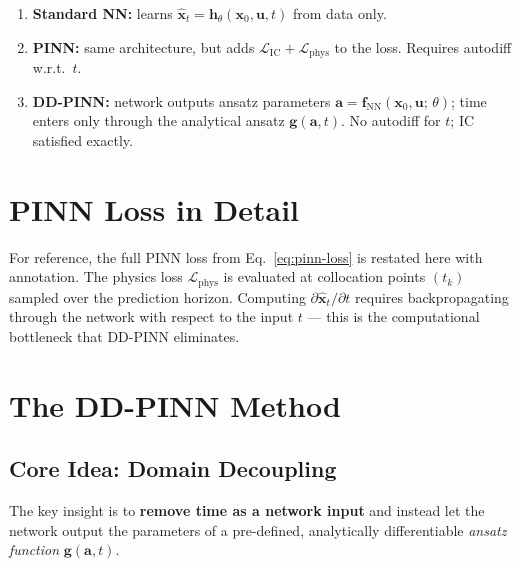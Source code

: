 \documentclass[11pt]{article}
\newcommand{\xhat}{\hat{\bm{x}}}
\newcommand{\avec}{\bm{a}}
\newcommand{\uvec}{\bm{u}}
\newcommand{\xvec}{\bm{x}}
\newcommand{\fnn}{\bm{f}_{\mathrm{NN}}}
\begin{document}
\begin{enumerate}
    \item \textbf{Standard NN:} learns $\xhat_t = \bm{h}_\theta(\xvec_0, \uvec, t)$ from data only.
    \item \textbf{PINN:} same architecture, but adds $\mathcal{L}_{\mathrm{IC}} + \mathcal{L}_{\mathrm{phys}}$ to the loss. Requires autodiff w.r.t.\ $t$.
    \item \textbf{DD-PINN:} network outputs ansatz parameters $\avec = \fnn(\xvec_0, \uvec;\, \theta)$; time enters only through the analytical ansatz $\bm{g}(\avec, t)$. No autodiff for $t$; IC satisfied exactly.
\end{enumerate}

\section{PINN Loss in Detail}

For reference, the full PINN loss from Eq.~\eqref{eq:pinn-loss} is restated here with annotation. The physics loss $\mathcal{L}_{\mathrm{phys}}$ is evaluated at collocation points $(t_k)$ sampled over the prediction horizon. Computing $\partial \xhat_t / \partial t$ requires backpropagating through the network with respect to the input $t$ --- this is the computational bottleneck that DD-PINN eliminates.

\section{The DD-PINN Method}
\label{sec:ddpinn}

\subsection{Core Idea: Domain Decoupling}

The key insight is to \textbf{remove time as a network input} and instead let the network output the parameters of a pre-defined, analytically differentiable \emph{ansatz function} $\bm{g}(\avec, t)$.
\end{document}
